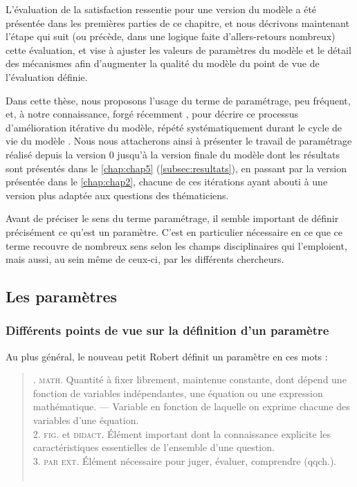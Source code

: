 L'évaluation de la \og satisfaction\fg{} ressentie pour une version du modèle a été présentée dans les premières parties de ce chapitre, et nous décrivons maintenant l'étape qui suit (ou précède, dans une logique faite d'allers-retours nombreux) cette évaluation, et vise à ajuster les valeurs de paramètres du modèle et le détail des mécanismes afin d'augmenter la qualité du modèle du point de vue de l'évaluation définie.

Dans cette thèse, nous proposons l'usage du terme de \og paramétrage\fg{}, peu fréquent, et, à notre connaissance, forgé récemment \autocite{hirtzel2015exploration,tannier_analyse_2017}, pour décrire ce processus d'\og amélioration\fg{} itérative du modèle, répété systématiquement durant le cycle de vie du modèle \simfeodal{}.
Nous nous attacherons ainsi à présenter le travail de paramétrage réalisé depuis la version 0 jusqu'à la version \og finale\fg{} du modèle dont les résultats sont présentés dans le \cref{chap:chap5} (\cref{subsec:resultats}), en passant par la version présentée dans le \cref{chap:chap2}, chacune de ces itérations ayant abouti à une version plus adaptée aux questions des thématiciens.

Avant de préciser le sens du terme \og paramétrage\fg{}, il semble important de définir précisément ce qu'est un paramètre.
C'est en particulier nécessaire en ce que ce terme recouvre de nombreux sens selon les champs disciplinaires qui l'emploient, mais aussi, au sein même de ceux-ci, par les différents chercheurs.

\subsection{Les paramètres}

\subsubsection{Différents points de vue sur la définition d'un paramètre}

Au plus général, le nouveau petit Robert définit un paramètre en ces mots :
\begin{quotation}
	\noindent {}. \textsc{math.} Quantité à fixer librement, maintenue constante, dont dépend une fonction de variables indépendantes, une équation ou une expression mathématique. --- Variable en fonction de laquelle on exprime chacune des variables d'une équation.\\
	2. \textsc{fig.} et \textsc{didact.} Élément important dont la connaissance explicite les caractéristiques essentielles de l'ensemble d'une question.\\
	3. \textsc{par ext.} Élément nécessaire pour juger, évaluer, comprendre (qqch.).\fg{}\\
	\mbox{}~ \hfill \autocite[\textbf{Paramètre}]{robert_nouveau_1993}
\end{quotation}


